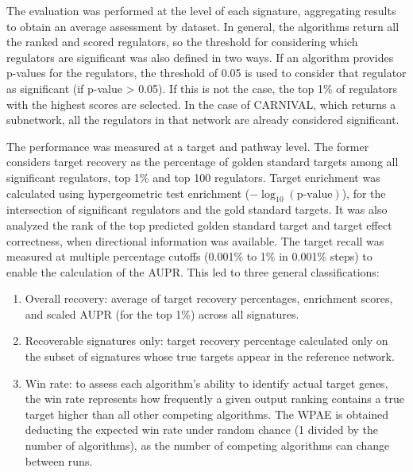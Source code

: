 The evaluation was performed at the level of each signature, aggregating results to obtain an average assessment by dataset.
In general, the algorithms return all the ranked and scored regulators, so the threshold for considering which regulators are significant was also defined in two ways.
If an algorithm provides p-values for the regulators, the threshold of 0.05 is used to consider that regulator as significant (if p-value > 0.05).
If this is not the case, the top 1\% of regulators with the highest scores are selected.
In the case of \gls{CARNIVAL}, which returns a subnetwork, all the regulators in that network are already considered significant.

The performance was measured at a target and pathway level.
The former considers target recovery as the percentage of golden standard targets among all significant regulators, top 1\% and top 100 regulators.
Target enrichment was calculated using hypergeometric test enrichment ($-\log_{10}(\text{p-value})$), for the intersection of significant regulators and the gold standard targets.
It was also analyzed the rank of the top predicted golden standard target and target effect correctness, when directional information was available.
The target recall was measured at multiple percentage cutoffs (0.001\% to 1\% in 0.001\% steps) to enable the calculation of the \gls{AUPR}. This led to three general classifications:

\begin{enumerate}
\item Overall recovery: average of target recovery percentages, enrichment scores, and scaled \gls{AUPR} (for the top 1\%) across all signatures.

\item Recoverable signatures only: target recovery percentage calculated only on the subset of signatures whose true targets appear in the reference network.

\item	Win rate: to assess each algorithm's ability to identify actual target genes, the win rate represents how frequently a given output ranking contains a true target higher than all other competing algorithms. The \gls{WPAE} is obtained deducting the expected win rate under random chance (1 divided by the number of algorithms), as the number of competing algorithms can change between runs. 
\end{enumerate}

